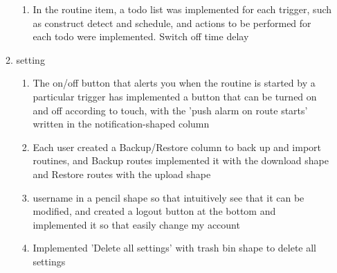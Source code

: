 \begin{enumerate}[label=\arabic*.]
\begin{enumerate}[label=\alph*]
\begin{enumerate}
            \item In the routine item, a todo list was implemented for each trigger, such as construct detect and schedule, and actions to be performed for each todo were implemented. Switch off time delay
        \end{enumerate}
        \item setting
            \begin{enumerate}
            \item The on/off button that alerts you when the routine is started by a particular trigger has implemented a button that can be turned on and off according to touch, with the 'push alarm on route starts' written in the notification-shaped column\\

            \item Each user created a Backup/Restore column to back up and import routines, and Backup routes implemented it with the download shape and Restore routes with the upload shape\\

            \item username in a pencil shape so that intuitively see that it can be modified, and created a logout button at the bottom and implemented it so that easily change my account\\

            \item Implemented 'Delete all settings' with trash bin shape to delete all settings
    \end{enumerate}
\end{enumerate}
\end{enumerate}